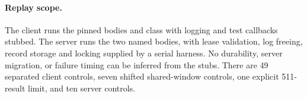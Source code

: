 \documentclass{article}
\begin{document}
\paragraph{Replay scope.}
The client runs the pinned bodies and class with logging and test
callbacks stubbed. The server runs the two named bodies, with lease
validation, log freeing, record storage and locking supplied by a
serial harness. No durability, server migration, or failure timing
can be inferred from the stubs. There are 49 separated client controls,
seven shifted shared-window controls, one explicit 511-result limit,
and ten server controls.
\end{document}
